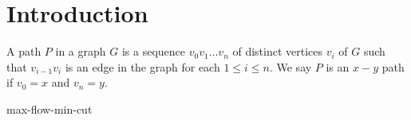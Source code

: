 \chapter{Introduction}

\cite{gt15} \cite{meng}

\begin{defn} A path $P$ in a graph $G$ is a sequence $v_0 v_1 \ldots v_n$ of distinct vertices $v_i$ of $G$ such that $v_{i-1} v_i$ is an edge in the graph for each $1 \leq i \leq n$. We say $P$ is an $x-y$ path if $v_0 = x$ and $v_n = y$. \end{defn}

max-flow-min-cut